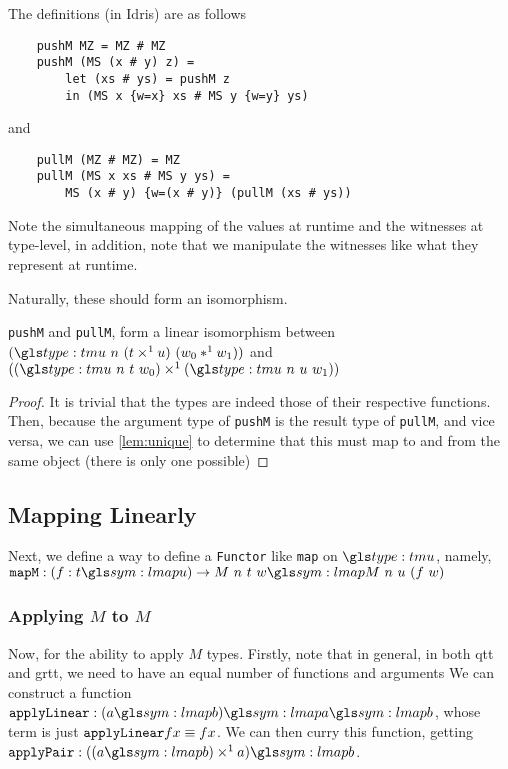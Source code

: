 The definitions (in Idris) are as follows 
\begin{verbatim}
	pushM MZ = MZ # MZ
	pushM (MS (x # y) z) = 
		let (xs # ys) = pushM z 
		in (MS x {w=x} xs # MS y {w=y} ys)
\end{verbatim}

and 

\begin{verbatim}
	pullM (MZ # MZ) = MZ
	pullM (MS x xs # MS y ys) = 
		MS (x # y) {w=(x # y)} (pullM (xs # ys))
\end{verbatim}

Note the simultaneous mapping of the values at runtime and the witnesses at type-level, in addition, note that we manipulate the witnesses like what they represent at runtime.

Naturally, these should form an isomorphism.

\begin{lemma}
	\verb|pushM| and \verb|pullM|, form a linear isomorphism between $(\tmu \ n \ (t \lpair u) \ (w_0 \ltup w_1))$ and $((\tmu \ n \ t \ w_0) \lpair (\tmu \ n \ u \ w_1))$
\end{lemma}

\begin{proof}
	It is trivial that the types are indeed those of their respective functions.
	Then, because the argument type of \verb|pushM| is the result type of \verb|pullM|, and vice versa, we can use \ref{lem:unique} to determine that this must map to and from the same object (there is only one possible)
\end{proof}

\subsection{Mapping Linearly}

\label{sec:map_lin}

Next, we define a way to define a \verb|Functor| like \verb|map| on $\tmu$, namely, $\verb|mapM| : (f : t \proc u) \to M \ n \ t \ w \proc M \ n \ u \ (f \ w)$


\subsubsection{Applying $M$ to $M$}

\label{sec:app_m_to_m}

Now, for the ability to apply $M$ types.
Firstly, note that in general, in both \gls{qtt} and \gls{grtt}, we need to have an equal number of functions and arguments \cite{eb_idris_qtt_prac, quant_graded_modal}
We can construct a function $\verb|applyLinear| : (a \proc b) \proc a \proc b$, whose term is just $\verb|applyLinear| f x \equiv f x$.
We can then curry  this function, getting $\verb|applyPair| : ((a \proc b) \lpair a) \proc b$.

